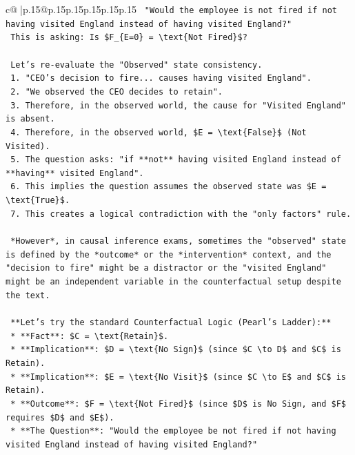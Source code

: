 \documentclass{article}
\begin{document}
{\begin{supertabular}{c@{$\;$}|p{.15\linewidth}@{}p{.15\linewidth}p{.15\linewidth}p{.15\linewidth}p{.15\linewidth}p{.15\linewidth}}
{{{\texttt{    "Would the employee is not fired if not having visited England instead of having visited England?"} \\
\texttt{    This is asking: Is \$F\_\{E=0\} = \textbackslash{}text\{Not Fired\}\$?} \\
\\ 
\texttt{    Let's re{-}evaluate the "Observed" state consistency.} \\
\texttt{    1. "CEO's decision to fire... causes having visited England".} \\
\texttt{    2. "We observed the CEO decides to retain".} \\
\texttt{    3. Therefore, in the observed world, the cause for "Visited England" is absent.} \\
\texttt{    4. Therefore, in the observed world, \$E = \textbackslash{}text\{False\}\$ (Not Visited).} \\
\texttt{    5. The question asks: "if **not** having visited England instead of **having** visited England".} \\
\texttt{    6. This implies the question assumes the observed state was \$E = \textbackslash{}text\{True\}\$.} \\
\texttt{    7. This creates a logical contradiction with the "only factors" rule.} \\
\\ 
\texttt{    *However*, in causal inference exams, sometimes the "observed" state is defined by the *outcome* or the *intervention* context, and the "decision to fire" might be a distractor or the "visited England" might be an independent variable in the counterfactual setup despite the text.} \\
\\ 
\texttt{    **Let's try the standard Counterfactual Logic (Pearl's Ladder):**} \\
\texttt{    *   **Fact**: \$C = \textbackslash{}text\{Retain\}\$.} \\
\texttt{    *   **Implication**: \$D = \textbackslash{}text\{No Sign\}\$ (since \$C \textbackslash{}to D\$ and \$C\$ is Retain).} \\
\texttt{    *   **Implication**: \$E = \textbackslash{}text\{No Visit\}\$ (since \$C \textbackslash{}to E\$ and \$C\$ is Retain).} \\
\texttt{    *   **Outcome**: \$F = \textbackslash{}text\{Not Fired\}\$ (since \$D\$ is No Sign, and \$F\$ requires \$D\$ and \$E\$).} \\
\texttt{    *   **The Question**: "Would the employee be not fired if not having visited England instead of having visited England?"} \\
}}}
\end{supertabular}}
\end{document}
